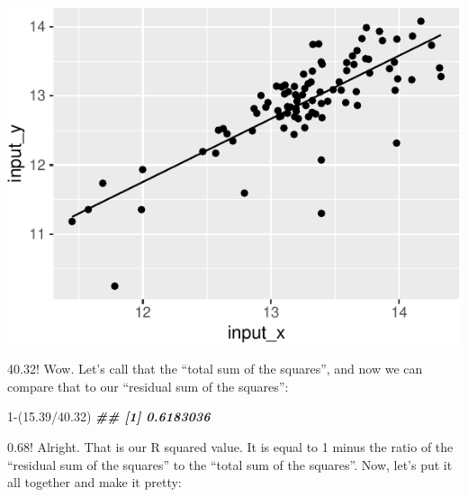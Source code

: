 \documentclass[
]{krantz}
\newenvironment{Shaded}{\begin{snugshade}}{\end{snugshade}}
\newcommand{\DecValTok}[1]{\textcolor[rgb]{0.00,0.00,0.81}{#1}}
\newcommand{\DocumentationTok}[1]{\textcolor[rgb]{0.56,0.35,0.01}{\textbf{\textit{#1}}}}
\newcommand{\FloatTok}[1]{\textcolor[rgb]{0.00,0.00,0.81}{#1}}
\newcommand{\NormalTok}[1]{#1}
\newcommand{\SpecialCharTok}[1]{\textcolor[rgb]{0.00,0.00,0.00}{#1}}
\begin{document}
\begin{center}\includegraphics{index_files/figure-latex/unnamed-chunk-126-1} \end{center}

40.32! Wow. Let's call that the ``total sum of the squares'', and now we can compare that to our ``residual sum of the squares'':

\begin{Shaded}
\begin{Highlighting}[]
\DecValTok{1}\SpecialCharTok{{-}}\NormalTok{(}\FloatTok{15.39}\SpecialCharTok{/}\FloatTok{40.32}\NormalTok{)}
\DocumentationTok{\#\# [1] 0.6183036}
\end{Highlighting}
\end{Shaded}

0.68! Alright. That is our R squared value. It is equal to 1 minus the ratio of the ``residual sum of the squares'' to the ``total sum of the squares''. Now, let's put it all together and make it pretty:
\end{document}
